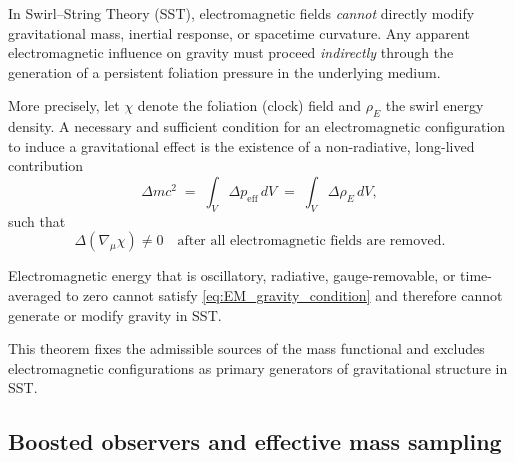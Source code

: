 \documentclass[10pt]{article}
\begin{document}
        \begin{theorem}
            \label{thm:EM_no_gravity}

            In Swirl--String Theory (SST), electromagnetic fields \emph{cannot} directly modify
            gravitational mass, inertial response, or spacetime curvature.
            Any apparent electromagnetic influence on gravity must proceed
            \emph{indirectly} through the generation of a persistent foliation
            pressure in the underlying medium.

            More precisely, let $\chi$ denote the foliation (clock) field and
            $\rho_{\!E}$ the swirl energy density.
            A necessary and sufficient condition for an electromagnetic configuration
            to induce a gravitational effect is the existence of a non-radiative,
            long-lived contribution
            \begin{equation}
                \Delta m c^2
                \;=\;
                \int_V \Delta p_{\mathrm{eff}} \, dV
                \;=\;
                \int_V \Delta \rho_{\!E} \, dV ,
                \label{eq:EM_gravity_condition}
            \end{equation}
            such that
            \begin{equation}
                \Delta(\nabla_\mu \chi) \neq 0
                \quad\text{after all electromagnetic fields are removed.}
                \label{eq:foliation_residual}
            \end{equation}

            Electromagnetic energy that is oscillatory, radiative, gauge-removable,
            or time-averaged to zero cannot satisfy
            \eqref{eq:EM_gravity_condition} and therefore cannot generate
            or modify gravity in SST.

        \end{theorem}

        This theorem fixes the admissible sources of the mass functional
        and excludes electromagnetic configurations as primary generators
        of gravitational structure in SST.

    \subsection{Boosted observers and effective mass sampling}
\end{document}
